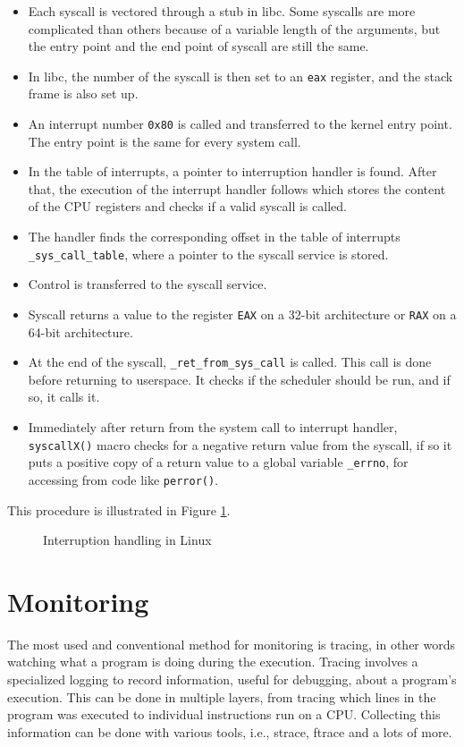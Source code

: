 \begin{itemize}
	\item Each syscall is vectored through a stub in libc.
    	  Some syscalls are more complicated than others because of a variable length of the arguments, but the entry point and the end point of syscall are still the same.
	\item In libc, the number of the syscall is then set to an \texttt{eax} register, and the stack frame is also set up.
	\item An interrupt number \texttt{0x80} is called and transferred to the kernel entry point.
    	  The entry point is the same for every system call.
	\item In the table of interrupts, a pointer to interruption handler is found.
    	  After that, the execution of the interrupt handler follows which stores the content of the CPU registers and checks if a valid syscall is called.
	\item The handler finds the corresponding offset in the table of interrupts \texttt{\_sys\_call\_table}, where a pointer to the syscall service is stored.
	\item Control is transferred to the syscall service.
	\item Syscall returns a value to the register \texttt{EAX} on a 32-bit architecture or \texttt{RAX} on a 64-bit architecture.
	\item At the end of the syscall, \texttt{\_ret\_from\_sys\_call\(\)} is called.
    	  This call is done before returning to userspace.
          It checks if the scheduler should be run, and if so, it calls it.
	\item Immediately after return from the system call to interrupt handler, \texttt{syscallX()} macro checks for a negative return value from the syscall, if so it puts a positive copy of a return value to a global variable \texttt{\_errno}, for accessing from code like \texttt{perror()}.
\end{itemize}

This procedure is illustrated in Figure \ref{fig:tikz:int_handling}.

\begin{figure}[]
  \centering
  
  \caption{Interruption handling in Linux}
  \label{fig:tikz:int_handling}
\end{figure}


\section{Monitoring}
The most used and conventional method for monitoring is tracing, in other words watching what a program is doing during the execution.
Tracing involves a specialized logging to record information, useful for debugging, about a program's execution.
This can be done in multiple layers, from tracing which lines in the program was executed to individual instructions run on a CPU.
Collecting this information can be done with various tools, i.e., strace, ftrace and a lots of more.

